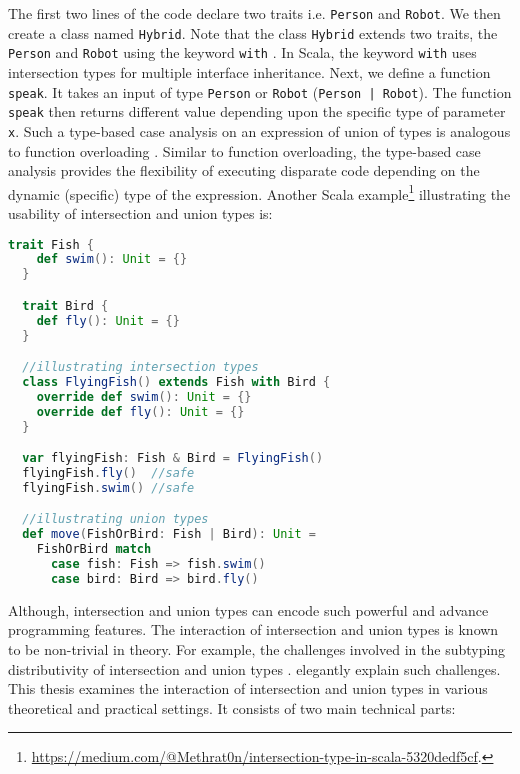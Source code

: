 \noindent The first two lines of the code declare two traits i.e.
\lstinline{Person} and \lstinline{Robot}. We then create
a class named \lstinline{Hybrid}. Note that the class 
\lstinline{Hybrid} extends two traits, the
\lstinline{Person} and \lstinline{Robot} using the
keyword \lstinline{with} . In Scala,
the keyword \lstinline{with} uses intersection types
for multiple interface inheritance.
Next, we define a function \lstinline{speak}. It takes
an input of type \lstinline{Person} or \lstinline{Robot} 
(\lstinline{Person | Robot}).
The function \lstinline{speak} then
returns different value depending upon the
specific type of parameter \lstinline{x}.
Such a type-based case analysis on an expression of
union of types is analogous to function overloading
\citep{castagna1995calculus, cardelli1985understanding, wadler1989make}.
Similar to function overloading, the type-based
case analysis provides the flexibility of
executing disparate code depending on the
dynamic (specific) type of the expression.
Another Scala example\footnote{\url{https://medium.com/@Methrat0n/intersection-type-in-scala-5320dedf5cf}.}
illustrating the usability of intersection and
union types is:

\begin{lstlisting}[language=Scala]
  trait Fish {
    def swim(): Unit = {}
  }

  trait Bird {
    def fly(): Unit = {}
  }

  //illustrating intersection types
  class FlyingFish() extends Fish with Bird {
    override def swim(): Unit = {}
    override def fly(): Unit = {}
  }

  var flyingFish: Fish & Bird = FlyingFish()
  flyingFish.fly()  //safe
  flyingFish.swim() //safe

  //illustrating union types
  def move(FishOrBird: Fish | Bird): Unit =
    FishOrBird match
      case fish: Fish => fish.swim()
      case bird: Bird => bird.fly()
\end{lstlisting}

Although, intersection and union types can encode
such powerful and advance programming features.
The interaction of 
intersection and union types is known to be non-trivial
in theory. For example, the challenges involved in the
subtyping distributivity of intersection
and union types \citep{barendregt1983filter}.
\cite{huang2021distributing} elegantly explain such challenges.
This thesis examines the interaction of 
intersection and union types in various 
theoretical and practical settings. 
It consists of two main technical parts:

